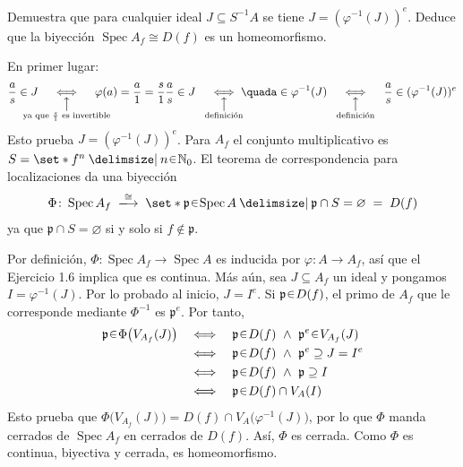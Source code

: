 \begin{ejer}
Demuestra que para cualquier ideal $J\subseteq S^{-1}A$ se tiene
\(
J=(\varphi^{-1}(J))^e.
\)
Deduce que la biyección $\operatorname{Spec}A_f\cong D(f)$ es un homeomorfismo.
\end{ejer}
\begin{sol}
En primer lugar:
\[
\frac{a}{s}\in J
\quad%
\underset{%
    \mathclap{\substack{%
    \big\uparrow\\\text{ya que }\frac{s}{1}\text{ es invertible}%
    }}
}{\iff}%
\quad%
\varphi(a)=\frac{a}{1}=\frac{s}{1}\frac{a}{s}\in J
\quad%
\underset{%
    \mathclap{\substack{%
    \big\uparrow\\\text{definición}%
    }}
}{\iff}%
\quad%
a\in\varphi^{-1}(J)
\quad%
\underset{%
    \mathclap{\substack{%
    \big\uparrow\\\text{definición}%
    }}
}{\iff}%
\quad%
\frac{a}{s}\in(\varphi^{-1}(J))^e
\]
Esto prueba $J=(\varphi^{-1}(J))^e$. Para $A_f$ el conjunto multiplicativo
es $S=\set*{f^n\given n\en\mathbb{N}_0}$. El teorema de correspondencia para
localizaciones da una biyección
\[
\Phi\colon\operatorname{Spec}A_f%
\;\xlongrightarrow{\cong}\;%
\set*{\mathfrak{p}\en\operatorname{Spec}A\given \mathfrak{p}\cap S=\varnothing}%
\;=\;%
D(f)
\]
ya que $\mathfrak{p}\cap S=\varnothing$ si y solo si $f\notin\mathfrak{p}$.

Por definición, $\Phi\colon\operatorname{Spec}A_f\to\operatorname{Spec}A$ es
inducida por $\varphi\colon A\to A_f$, así que el Ejercicio 1.6 implica que
es continua. Más aún, sea $J\subseteq A_f$ un ideal y pongamos
$I=\varphi^{-1}(J)$. Por lo probado al inicio, $J=I^e$. Si
$\mathfrak{p}\en D(f)$, el primo de $A_f$ que le corresponde mediante
$\Phi^{-1}$ es $\mathfrak{p}^e$. Por tanto,
\begin{align*}
\mathfrak{p}\en\Phi\bigl(V_{A_f}(J)\bigr)
&\quad\Longleftrightarrow\quad
\mathfrak{p}\en D(f)\ \wedge\ \mathfrak{p}^e\en V_{A_f}(J)\\
&\quad\Longleftrightarrow\quad
\mathfrak{p}\en D(f)\ \wedge\ \mathfrak{p}^e\supseteq J=I^e\\
&\quad\Longleftrightarrow\quad
\mathfrak{p}\en D(f)\ \wedge\ \mathfrak{p}\supseteq I\\
&\quad\Longleftrightarrow\quad
\mathfrak{p}\en D(f)\cap V_A(I)
\end{align*}
Esto prueba que
$\Phi\bigl(V_{A_f}(J)\bigr)=D(f)\cap V_A\bigl(\varphi^{-1}(J)\bigr)$,
por lo que $\Phi$ manda cerrados de $\operatorname{Spec}A_f$ en cerrados de
$D(f)$. Así, $\Phi$ es cerrada. Como $\Phi$ es continua, biyectiva y cerrada,
es homeomorfismo.
\end{sol}